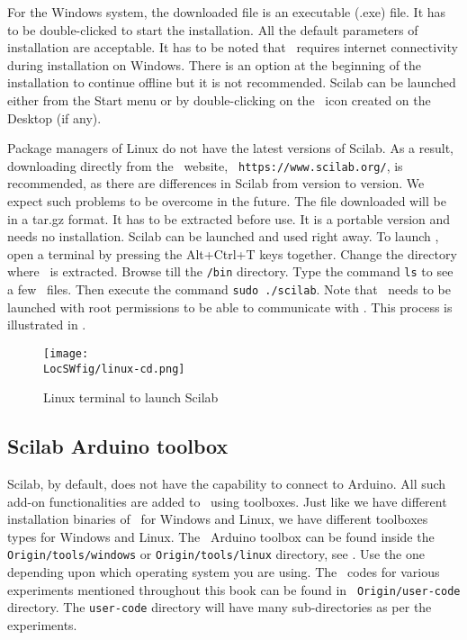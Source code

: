 For the Windows system, the downloaded file is an executable (.exe) file.
It has to be double-clicked to start the installation. All the default
parameters of installation are acceptable.  It has to be noted that
\scilab\ requires internet connectivity during installation on
Windows.  There is an option at the beginning of the installation to
continue offline but it is not recommended.  Scilab can be launched
either from the Start menu or by double-clicking on the \scilab\ icon
created on the Desktop (if any).

Package managers of Linux do not have the latest versions of Scilab.
As a result, downloading directly from the \scilab\ website, {\tt
            https://www.scilab.org/}, is recommended, as there are differences in
Scilab from version to version.  We expect such problems to be overcome
in the future.  The file downloaded will be in a tar.gz format.  It has
to be extracted before use.  It is a portable version and needs no
installation. Scilab can be launched and used right away.  To launch
\scilab, open a terminal by pressing the Alt+Ctrl+T keys
together. Change the directory where \scilab\ is extracted. Browse
till the {\tt /bin} directory. Type the command {\tt ls} to see a few
\scilab\ files.  Then execute the command {\tt sudo ./scilab}. Note
that \scilab\ needs to be launched with root permissions to be able to
communicate with \arduino. This process is illustrated in
.
\begin{figure}
      \centering
      \texttt{[image: \\LocSWfig/linux-cd.png]}
      \caption{Linux terminal to launch Scilab}
      \label{linux-cd}
\end{figure}

\subsection{Scilab Arduino toolbox}
Scilab, by default, does not have the capability to connect to
Arduino. All such add-on functionalities are added to \scilab\ using
toolboxes. Just like we have different installation binaries of
\scilab\ for Windows and Linux, we have different toolboxes types for
Windows and Linux. The \scilab\ Arduino toolbox can be found inside
the {\tt Origin/tools/windows} or {\tt Origin/tools/linux} directory,
see .  Use the one depending upon
which operating system you are using. The \scilab\ codes for various
experiments mentioned throughout this book can be found in {\tt
            Origin/user-code} directory. The {\tt user-code} directory will have
many sub-directories as per the experiments.

